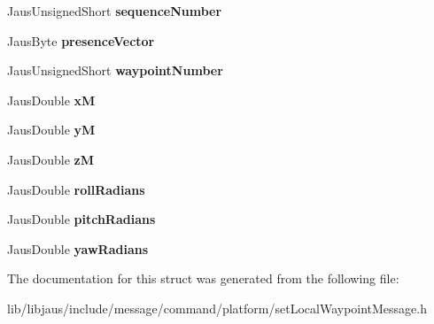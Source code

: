 \begin{DoxyCompactItemize}
\item 
\hypertarget{struct_set_local_waypoint_message_struct_a8aafd8b210c7f40cd35530c51245590a}{\-Jaus\-Unsigned\-Short {\bfseries sequence\-Number}}\label{struct_set_local_waypoint_message_struct_a8aafd8b210c7f40cd35530c51245590a}

\item 
\hypertarget{struct_set_local_waypoint_message_struct_a1dd0519b4b5eb4e40049625b09a7e5e0}{\-Jaus\-Byte {\bfseries presence\-Vector}}\label{struct_set_local_waypoint_message_struct_a1dd0519b4b5eb4e40049625b09a7e5e0}

\item 
\hypertarget{struct_set_local_waypoint_message_struct_a92fce724d30fd2360f051914458ea182}{\-Jaus\-Unsigned\-Short {\bfseries waypoint\-Number}}\label{struct_set_local_waypoint_message_struct_a92fce724d30fd2360f051914458ea182}

\item 
\hypertarget{struct_set_local_waypoint_message_struct_aad4c7a9c1b48616dc5748b0daca70428}{\-Jaus\-Double {\bfseries x\-M}}\label{struct_set_local_waypoint_message_struct_aad4c7a9c1b48616dc5748b0daca70428}

\item 
\hypertarget{struct_set_local_waypoint_message_struct_a86f4e7af2ce6044a3c093c5aa4548a60}{\-Jaus\-Double {\bfseries y\-M}}\label{struct_set_local_waypoint_message_struct_a86f4e7af2ce6044a3c093c5aa4548a60}

\item 
\hypertarget{struct_set_local_waypoint_message_struct_a25049872a1b1691e95ce38e91214341d}{\-Jaus\-Double {\bfseries z\-M}}\label{struct_set_local_waypoint_message_struct_a25049872a1b1691e95ce38e91214341d}

\item 
\hypertarget{struct_set_local_waypoint_message_struct_afdac9f1d9a89cc673f1eaed5db5e1dcb}{\-Jaus\-Double {\bfseries roll\-Radians}}\label{struct_set_local_waypoint_message_struct_afdac9f1d9a89cc673f1eaed5db5e1dcb}

\item 
\hypertarget{struct_set_local_waypoint_message_struct_ad4da973bff5e2b1767618367929c3e56}{\-Jaus\-Double {\bfseries pitch\-Radians}}\label{struct_set_local_waypoint_message_struct_ad4da973bff5e2b1767618367929c3e56}

\item 
\hypertarget{struct_set_local_waypoint_message_struct_abcd307d3f15f78253e86504434680245}{\-Jaus\-Double {\bfseries yaw\-Radians}}\label{struct_set_local_waypoint_message_struct_abcd307d3f15f78253e86504434680245}

\end{DoxyCompactItemize}


\-The documentation for this struct was generated from the following file\-:\begin{DoxyCompactItemize}
\item 
lib/libjaus/include/message/command/platform/set\-Local\-Waypoint\-Message.\-h\end{DoxyCompactItemize}
